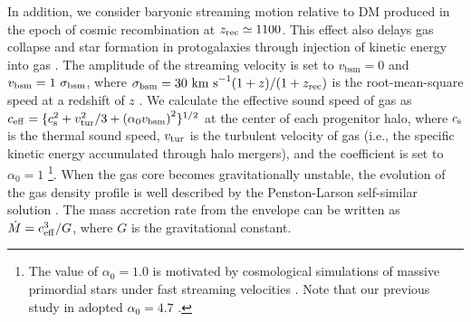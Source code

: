 \documentclass[twocolumn, twocolappendix]{aastex63}
\newcommand{\vbsm}{v_\mathrm{bsm}}
\begin{document}
\begin{CJK*}{UTF8}{gbsn}
In addition, we consider baryonic streaming motion relative to DM produced in the epoch of cosmic recombination at $z_{\rm rec} \simeq 1100$.
This effect also delays gas collapse and star formation in protogalaxies through injection of kinetic energy into gas
\citep[e.g.,][]{2012MNRAS.424.1335F, 2014MNRAS.439.1092T, 2017Sci...357.1375H,2019MNRAS.484.3510S,2021ApJ...917...60L}.
The amplitude of the streaming velocity is set to $\vbsm = 0$ and $\vbsm=1~\sigma_{\rm bsm}$, where $\sigma_{\rm bsm}=30~{\rm km~s}^{-1} (1+z)/(1+z_{\rm rec})$
is the root-mean-square speed at a redshift of $z$ \citep{2010PhRvD..82h3520T}.
We calculate the effective sound speed of gas as $c_{\rm eff} = \{c_{\rm s}^2+v_{\rm tur}^2/3+\left(\alpha_0 \vbsm \right)^2 \}^{1/2}$ at the center of each progenitor halo,
where $c_{\rm s}$ is the thermal sound speed, $v_{\rm tur}$ is the turbulent velocity of gas (i.e., the specific kinetic energy accumulated through halo mergers), and
the coefficient is set to $\alpha_0=1$ \footnote{The value of $\alpha_0=1.0$ is motivated by cosmological simulations of massive primordial stars
under fast streaming velocities \citep{2017Sci...357.1375H,2019MNRAS.484.3510S}.
Note that our previous study in \citet{2021ApJ...917...60L} adopted $\alpha_0=4.7$ \citep{2018ApJ...855...17H}.}.
When the gas core becomes gravitationally unstable, the evolution of the gas density profile is well described by 
the Penston-Larson self-similar solution \citep{1969MNRAS.144..425P,1969MNRAS.145..271L}. 
The mass accretion rate from the envelope can be written as $\dot{M}=c_{\rm eff}^3/G$,
where $G$ is the gravitational constant.




\end{CJK*}
\end{document}
